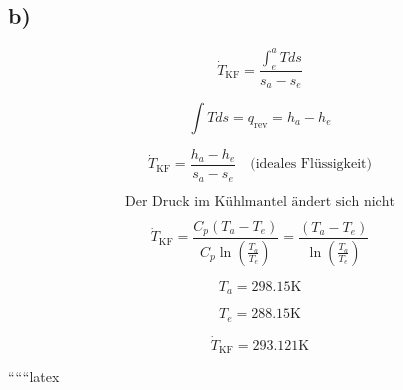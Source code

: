 

\subsection*{b)}

\[
\dot{T}_{\text{KF}} = \frac{\int_{e}^{a} T ds}{s_a - s_e}
\]

\[
\int T ds = q_{\text{rev}} = h_a - h_e
\]

\[
\dot{T}_{\text{KF}} = \frac{h_a - h_e}{s_a - s_e} \quad \text{(ideales Flüssigkeit)}
\]

\[
\text{Der Druck im Kühlmantel ändert sich nicht}
\]

\[
\dot{T}_{\text{KF}} = \frac{C_p \left( T_a - T_e \right)}{C_p \ln \left( \frac{T_a}{T_e} \right)} = \frac{\left( T_a - T_e \right)}{\ln \left( \frac{T_a}{T_e} \right)}
\]

\[
T_a = 298.15 \text{K}
\]

\[
T_e = 288.15 \text{K}
\]

\[
\dot{T}_{\text{KF}} = 293.121 \text{K}
\]

``````latex